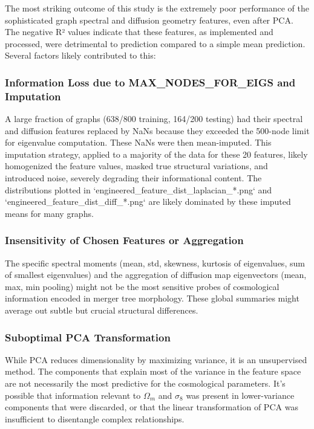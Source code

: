 \documentclass[twocolumn]{aastex631}
\begin{document}
The most striking outcome of this study is the extremely poor performance of the sophisticated graph spectral and diffusion geometry features, even after PCA. The negative R² values indicate that these features, as implemented and processed, were detrimental to prediction compared to a simple mean prediction. Several factors likely contributed to this:

\subsubsection{Information Loss due to MAX\_NODES\_FOR\_EIGS and Imputation}
A large fraction of graphs (638/800 training, 164/200 testing) had their spectral and diffusion features replaced by NaNs because they exceeded the 500-node limit for eigenvalue computation. These NaNs were then mean-imputed. This imputation strategy, applied to a majority of the data for these 20 features, likely homogenized the feature values, masked true structural variations, and introduced noise, severely degrading their informational content. The distributions plotted in `engineered_feature_dist_laplacian_*.png` and `engineered_feature_dist_diff_*.png` are likely dominated by these imputed means for many graphs.

\subsubsection{Insensitivity of Chosen Features or Aggregation}
The specific spectral moments (mean, std, skewness, kurtosis of eigenvalues, sum of smallest eigenvalues) and the aggregation of diffusion map eigenvectors (mean, max, min pooling) might not be the most sensitive probes of cosmological information encoded in merger tree morphology. These global summaries might average out subtle but crucial structural differences.

\subsubsection{Suboptimal PCA Transformation}
While PCA reduces dimensionality by maximizing variance, it is an unsupervised method. The components that explain most of the variance in the feature space are not necessarily the most predictive for the cosmological parameters. It's possible that information relevant to $\Omega_m$ and $\sigma_8$ was present in lower-variance components that were discarded, or that the linear transformation of PCA was insufficient to disentangle complex relationships.
\end{document}
